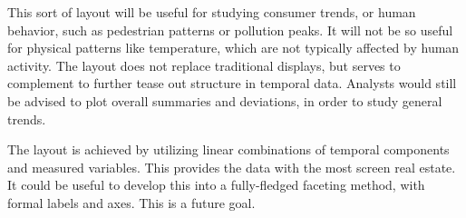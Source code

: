 \documentclass[article]{jss}
\theoremstyle{definition}
\theoremstyle{definition}
\theoremstyle{definition}
\theoremstyle{remark}
\begin{document}
This sort of layout will be useful for studying consumer trends, or
human behavior, such as pedestrian patterns or pollution peaks. It will
not be so useful for physical patterns like temperature, which are not
typically affected by human activity. The layout does not replace
traditional displays, but serves to complement to further tease out
structure in temporal data. Analysts would still be advised to plot
overall summaries and deviations, in order to study general trends.

The layout is achieved by utilizing linear combinations of temporal
components and measured variables. This provides the data with the most
screen real estate. It could be useful to develop this into a
fully-fledged faceting method, with formal labels and axes. This is a
future goal.


\end{document}
